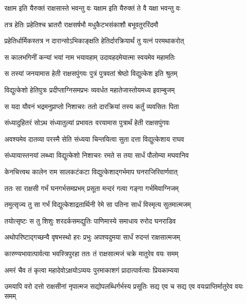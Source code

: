 \twolineshloka
{रक्षाम इति यैरुक्तं राक्षसास्ते भवन्तु वः}
{यक्षाम इति यैरुक्तं ते वै यक्षा भवन्तु वः} %

\twolineshloka
{तत्र हेतिः प्रहेतिश्च भ्रातरौ राक्षसर्षभौ}
{मधुकैटभसंकाशौ बभूवतुररिंदमौ} %

\twolineshloka
{प्रहेतिर्धार्मिकस्तत्र न दारान्सोऽभिकाङ्क्षति}
{हेतिर्दारक्रियार्थं तु यत्नं परमथाकरोत्} %

\twolineshloka
{स कालभगिनीं कन्यां भयां नाम भयावहाम्}
{उदावहदमेयात्मा स्वयमेव महामतिः} %

\twolineshloka
{स तस्यां जनयामास हेती राक्षसपुंगवः}
{पुत्रं पुत्रवतां श्रेष्ठो विद्युत्केश इति श्रुतम्} %

\twolineshloka
{विद्युत्केशो हेतिपुत्रः प्रदीप्ताग्निसमप्रभः}
{व्यवर्धत महातेजास्तोयमध्य इवाम्बुजम्} %

\twolineshloka
{स यदा यौवनं भद्रमनुप्राप्तो निशाचरः}
{ततो दारक्रियां तस्य कर्तुं व्यवसितः पिता} %

\twolineshloka
{संध्यादुहितरं सोऽथ संध्यातुल्यां प्रभावतः}
{वरयामास पुत्रार्थं हेती राक्षसपुंगवः} %

\twolineshloka
{अवश्यमेव दातव्या परस्मै सेति संध्यया}
{चिन्तयित्वा सुता दत्ता विद्युत्केशाय राघव} %

\twolineshloka
{संध्यायास्तनयां लब्ध्वा विद्युत्केशो निशाचरः}
{रमते स तया सार्धं पौलोम्या मघवानिव} %

\twolineshloka
{केनचित्त्वथ कालेन राम सालकटंकटा}
{विद्युत्केशाद्गर्भमाप घनराजिरिवार्णवात्} %

\twolineshloka
{ततः सा राक्षसी गर्भं घनगर्भसमप्रभम्}
{प्रसूता मन्दरं गत्वा गङ्गा गर्भमिवाग्निजम्} %

\twolineshloka
{तमुत्सृज्य तु सा गर्भं विद्युत्केशाद्रतार्थिनी}
{रेमे सा पतिना सार्धं विस्मृत्य सुतमात्मजम्} %

\twolineshloka
{तयोत्सृष्टः स तु शिशुः शरदर्कसमद्युतिः}
{पाणिमास्ये समाधाय रुरोद घनराडिव} %

\twolineshloka
{अथोपरिष्टाद्गच्छन्वै वृषभस्थो हरः प्रभुः}
{अपश्यदुमया सार्धं रुदन्तं राक्षसात्मजम्} %

\twolineshloka
{कारुण्यभावात्पार्वत्या भवस्त्रिपुरहा ततः}
{तं राक्षसात्मजं चक्रे मातुरेव वयः समम्} %

\twolineshloka
{अमरं चैव तं कृत्वा महादेवोऽक्षयोऽव्ययः}
{पुरमाकाशगं प्रादात्पार्वत्याः प्रियकाम्यया} %

\threelineshloka
{उमयापि वरो दत्तो राक्षसीनां नृपात्मज}
{सद्योपलब्धिर्गर्भस्य प्रसूतिः सद्य एव च}
{सद्य एव वयःप्राप्तिर्मातुरेव वयः समम्} %

